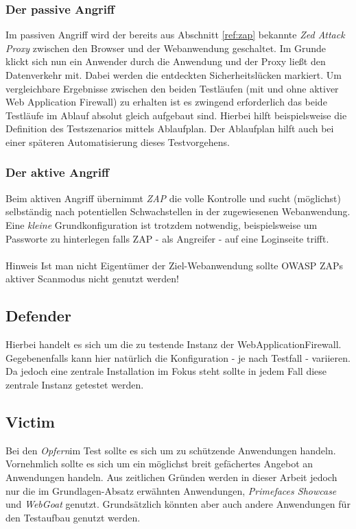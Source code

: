\subsubsection{Der passive Angriff}
Im passiven Angriff wird der bereits aus Abschnitt \ref{ref:zap} bekannte \emph{Zed Attack Proxy} zwischen den Browser und der Webanwendung geschaltet. Im Grunde klickt sich nun ein Anwender durch die Anwendung und der Proxy ließt den Datenverkehr mit. Dabei werden die entdeckten Sicherheitslücken markiert. Um vergleichbare Ergebnisse zwischen den beiden Testläufen (mit und ohne aktiver Web Application Firewall) zu erhalten ist es zwingend erforderlich das beide Testläufe im Ablauf absolut gleich aufgebaut sind. Hierbei hilft beispielsweise die Definition des Testszenarios mittels Ablaufplan. Der Ablaufplan hilft auch bei einer späteren Automatisierung dieses Testvorgehens.

\subsubsection{Der aktive Angriff}
Beim aktiven Angriff übernimmt \emph{ZAP} die volle Kontrolle und sucht (möglichst) selbständig nach potentiellen Schwachstellen in der zugewiesenen Webanwendung. Eine \emph{kleine} Grundkonfiguration ist trotzdem notwendig, beispielsweise um Passworte zu hinterlegen falls ZAP - als Angreifer - auf eine Loginseite trifft. \\\\
\textcolor{bhtGray}{ Hinweis} Ist man nicht Eigentümer der Ziel-Webanwendung sollte OWASP ZAPs aktiver Scanmodus nicht genutzt werden!\\


\subsection{Defender}

Hierbei handelt es sich um die zu testende Instanz der WebApplicationFirewall. Gegebenenfalls kann hier natürlich die Konfiguration - je nach Testfall - variieren. Da jedoch eine zentrale Installation im Fokus steht sollte in jedem Fall diese zentrale Instanz getestet werden.

\subsection{Victim}

Bei den \glqq\emph{Opfern}\grqq  im Test sollte es sich um zu schützende Anwendungen handeln. Vornehmlich sollte es sich um ein möglichst breit gefächertes Angebot an Anwendungen handeln. Aus zeitlichen Gründen werden in dieser Arbeit jedoch nur die im Grundlagen-Absatz erwähnten Anwendungen, \emph{Primefaces Showcase} und \emph{WebGoat} genutzt. Grundsätzlich könnten aber auch andere Anwendungen für den Testaufbau genutzt werden.\\ 

